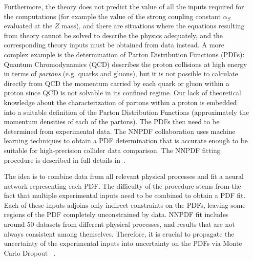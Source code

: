 Furthermore, the theory does not predict the value of all the inputs required for the computations (for example the
value of the strong coupling constant $\alpha_S$ evaluated at the $Z$ mass), and there are situations where the equations
resulting from theory cannot be solved to describe the physics adequately, and the corresponding theory inputs must be obtained from data instead. A more complex example is the determination of Parton Distribution Functions (PDFs): Quantum Chromodynamics (QCD) describes the proton collisions at high energy in terms of \emph{partons} (e.g. quarks and gluons), but it is not possible to calculate directly from QCD the momentum carried by each quark or gluon within a proton since QCD is not solvable in its confined regime. Our lack of theoretical knowledge about the characterization of
partons within a proton is embedded into a suitable definition of the Parton Distribution Functions (approximately the momentum densities of each of the partons). The PDFs then need to be determined from experimental data. The NNPDF collaboration uses machine learning techniques to obtain a PDF determination that is accurate enough to be suitable for high-precision collider data comparison. The NNPDF fitting procedure is described in full details in~\cite{Ball:2014uwa}.

The idea is to combine data from all relevant physical processes and fit a neural network representing each PDF. The difficulty of the procedure stems from the fact that multiple experimental inputs need to be combined to obtain
a PDF fit. Each of these inputs adjoins only indirect constraints on the PDFs, leaving some regions of the PDF
completely unconstrained by data. NNPDF fit includes around 50 datasets from different physical processes, and results that are not always consistent among themselves. Therefore, it is crucial to propagate the uncertainty of the experimental inputs into uncertainty on the PDFs via Monte Carlo Dropout ~\cite{2015arXiv150602142G}.

